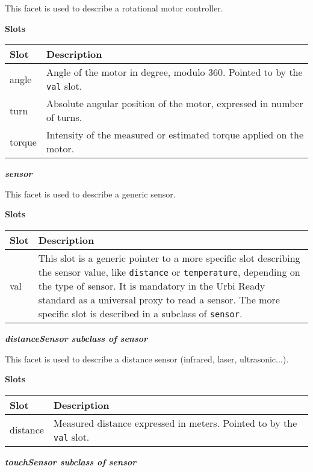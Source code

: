 \documentclass[a4paper]{article}
\begin{document}
{\sffamily
This facet is used to describe a rotational motor controller.}

{\sffamily\bfseries
Slots}

\begin{flushleft}
\tablehead{}
\begin{supertabular}{|m{2.8669999cm}|m{12.422cm}|}
\hline
\sffamily\bfseries Slot &
\sffamily\bfseries Description\\\hline
angle &
\sffamily Angle of the motor in degree, modulo
360. Pointed to by the \texttt{val} slot.\\\hline
turn &
\sffamily Absolute angular position of the
motor, expressed in number of turns.\\\hline
torque &
\sffamily Intensity of the measured or estimated
torque applied on the motor.\\\hline
\end{supertabular}
\end{flushleft}
{\sffamily\bfseries\itshape
sensor}

{\sffamily
This facet is used to describe a generic sensor.}

{\sffamily\bfseries
Slots}

\begin{flushleft}
\tablehead{}
\begin{supertabular}{|m{2.8669999cm}|m{12.422cm}|}
\hline
\sffamily\bfseries Slot &
\sffamily\bfseries Description\\\hline
val &
\sffamily This slot is a generic pointer to a
more specific slot describing the sensor value, like \texttt{distance}
or \texttt{temperature}, depending on the type of sensor. It is
mandatory in the Urbi Ready standard as a universal proxy to read a
sensor. The more specific slot is described in a subclass of
\texttt{sensor}.\\\hline
\end{supertabular}
\end{flushleft}
{\sffamily\bfseries\itshape
 distanceSensor  \textmd{subclass of sensor}}

{\sffamily
This facet is used to describe a distance sensor (infrared, laser,
ultrasonic...).}

{\sffamily\bfseries
Slots}

\begin{flushleft}
\tablehead{}
\begin{supertabular}{|m{2.8669999cm}|m{12.422cm}|}
\hline
\sffamily\bfseries Slot &
\sffamily\bfseries Description\\\hline
distance &
\sffamily Measured distance expressed in meters.
Pointed to by the \texttt{val} slot.\\\hline
\end{supertabular}
\end{flushleft}
{\sffamily\bfseries\itshape
 touchSensor  \textmd{subclass of sensor}}
\end{document}

